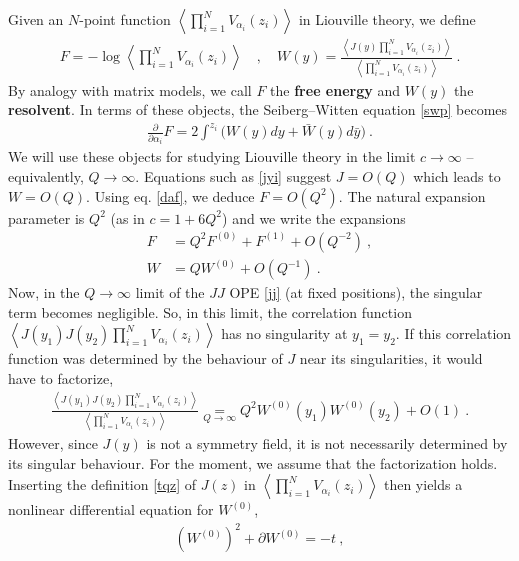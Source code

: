 \documentclass[12pt, a4paper, notitlepage, twoside]{report}
\numberwithin{equation}{section}
\theoremstyle{break}
\begin{document}
Given an $N$-point function $\left\langle \prod_{i=1}^N V_{\alpha_i}(z_i) \right\rangle$ in Liouville theory, we define
\begin{align}
 \boxed{F= -\log \left\langle \prod_{i=1}^N V_{\alpha_i}(z_i) \right\rangle} \quad , \quad \boxed{W(y) = \frac{\left\langle J(y)\prod_{i=1}^N V_{\alpha_i}(z_i) \right\rangle}{\left\langle \prod_{i=1}^N V_{\alpha_i}(z_i) \right\rangle}} \ .
 \label{fwy}
\end{align}
By analogy with matrix models, we call $F$ the \textbf{\boldmath free energy} and $W(y)$ the \textbf{resolvent}.
In terms of these objects, the Seiberg--Witten equation \eqref{swp} becomes 
\begin{align}
 {\frac{\partial}{\partial \alpha_i}} F = 2 \int^{z_i} \Big(W(y)dy+\bar W(y)d\bar y\Big)\ . 
\label{daf}
\end{align}
We will use these objects for studying Liouville theory in the limit $c\to \infty$ -- equivalently, $Q\to \infty$.
Equations such as \eqref{jyi} suggest $J=O(Q)$ which leads to $W=O(Q)$.
Using eq. \eqref{daf}, we deduce $F=O(Q^2)$.
The natural expansion parameter is $Q^2$ (as in $c=1+6Q^2$) and we write the expansions
\begin{align}
 F &= Q^2 F^{(0)} + F^{(1)} + O(Q^{-2})\ ,
\\
W & = QW^{(0)} + O(Q^{-1})\ .
\end{align}
Now, in the $Q\to \infty$ limit of the $JJ$ OPE \eqref{jj} (at fixed positions), the singular term becomes negligible. So, in this limit, the correlation function $ \left\langle J(y_1)J(y_2)\prod_{i=1}^N V_{\alpha_i}(z_i) \right\rangle$ has no singularity at $y_1=y_2$. If this correlation function was determined by the behaviour of $J$ near its singularities, it would have to factorize,
\begin{align}
 \frac{\left\langle J(y_1)J(y_2)\prod_{i=1}^N V_{\alpha_i}(z_i)\right\rangle}{\left\langle \prod_{i=1}^N V_{\alpha_i}(z_i) \right\rangle} \underset{Q\to \infty}{=} Q^2W^{(0)}(y_1)W^{(0)}(y_2) + O(1)\ .
 \label{lqfac}
\end{align}
However, since $J(y)$ is not a symmetry field, it is not necessarily determined by its singular behaviour. For the moment, we assume that the factorization holds.
Inserting the definition \eqref{tqz} of $J(z)$ in $\left\langle \prod_{i=1}^N V_{\alpha_i}(z_i) \right\rangle$ then yields a nonlinear differential equation for $W^{(0)}$,
\begin{align}
 \boxed{\left(W^{(0)}\right)^2 + \partial W^{(0)} = - t}\ ,
\label{wwwt}
\end{align}
\end{document}
